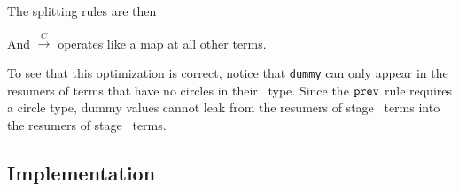 
The splitting rules are then
And $\overset{C}{\rightarrow}$ operates like a map at all other terms.

To see that this optimization is correct, notice that \texttt{dummy} can only
appear in the resumers of terms that have no circles in their \lang\ type.
Since the ${\tt prev}$ rule requires a circle type, dummy values cannot leak from the
resumers of stage \bbone\ terms into the resumers of stage \bbtwo\ terms.



\subsection{Implementation}


